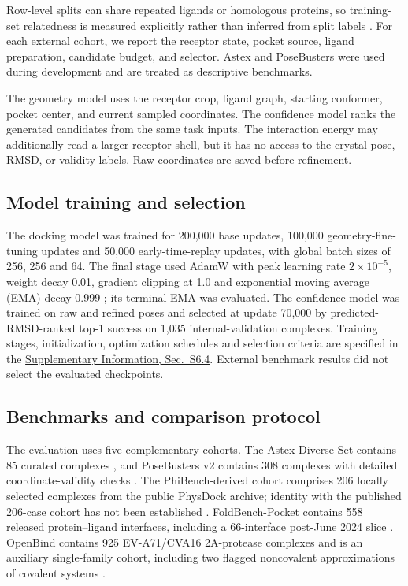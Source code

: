 \documentclass{article}
\newcommand{\citep}[1]{\cite{#1}}
\newcommand{\sisection}[1]{\href{SI.pdf}{Supplementary Information, Sec.~#1}}
\begin{document}
Row-level splits can share repeated ligands or homologous proteins, so training-set relatedness is measured explicitly rather than inferred from split labels \citep{durairaj2024plinder,corso2024dockgen,morehead2026posebench,skrinjar2026generalization}.
For each external cohort, we report the receptor state, pocket source, ligand preparation, candidate budget, and selector.
Astex and PoseBusters were used during development and are treated as descriptive benchmarks.

The geometry model uses the receptor crop, ligand graph, starting conformer, pocket center, and current sampled coordinates.
The confidence model ranks the generated candidates from the same task inputs.
The interaction energy may additionally read a larger receptor shell, but it has no access to the crystal pose, RMSD, or validity labels.
Raw coordinates are saved before refinement.

\subsection{Model training and selection}
\label{sec:geometry_training}
\label{sec:confidence_training}

The docking model was trained for 200,000 base updates, 100,000 geometry-fine-tuning updates and 50,000 early-time-replay updates, with global batch sizes of 256, 256 and 64. The final stage used AdamW with peak learning rate \(2\times10^{-5}\), weight decay 0.01, gradient clipping at 1.0 and exponential moving average (EMA) decay 0.999 \citep{loshchilov2019decoupled}; its terminal EMA was evaluated. The confidence model was trained on raw and refined poses and selected at update 70,000 by predicted-RMSD-ranked top-1 success on 1,035 internal-validation complexes. Training stages, initialization, optimization schedules and selection criteria are specified in the \sisection{S6.4}. External benchmark results did not select the evaluated checkpoints.

\subsection{Benchmarks and comparison protocol}
\label{sec:evaluation_tasks}
\label{sec:baselines}

The evaluation uses five complementary cohorts.
The Astex Diverse Set contains 85 curated complexes \citep{hartshorn2007astex}, and PoseBusters v2 contains 308 complexes with detailed coordinate-validity checks \citep{buttenschoen2024posebusters}.
The PhiBench-derived cohort comprises 206 locally selected complexes from the public PhysDock archive; identity with the published 206-case cohort has not been established \citep{zhang2025physdock}.
FoldBench-Pocket contains 558 released protein--ligand interfaces, including a 66-interface post-June 2024 slice \citep{xu2026foldbench}.
OpenBind contains 925 EV-A71/CVA16 2A-protease complexes and is an auxiliary single-family cohort, including two flagged noncovalent approximations of covalent systems \citep{openbind2026eva71}.
\end{document}
